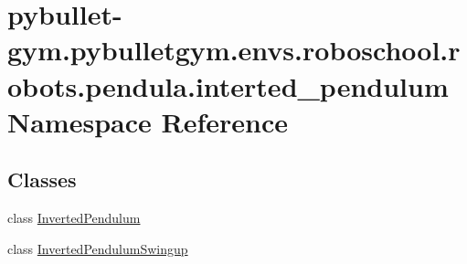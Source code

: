 \hypertarget{namespacepybullet-gym_1_1pybulletgym_1_1envs_1_1roboschool_1_1robots_1_1pendula_1_1interted__pendulum}{}\section{pybullet-\/gym.pybulletgym.\+envs.\+roboschool.\+robots.\+pendula.\+interted\+\_\+pendulum Namespace Reference}
\label{namespacepybullet-gym_1_1pybulletgym_1_1envs_1_1roboschool_1_1robots_1_1pendula_1_1interted__pendulum}
\subsection*{Classes}
\begin{DoxyCompactItemize}
\item 
class \hyperlink{classpybullet-gym_1_1pybulletgym_1_1envs_1_1roboschool_1_1robots_1_1pendula_1_1interted__pendulum_1_1_inverted_pendulum}{Inverted\+Pendulum}
\item 
class \hyperlink{classpybullet-gym_1_1pybulletgym_1_1envs_1_1roboschool_1_1robots_1_1pendula_1_1interted__pendulum_1_1_inverted_pendulum_swingup}{Inverted\+Pendulum\+Swingup}
\end{DoxyCompactItemize}
